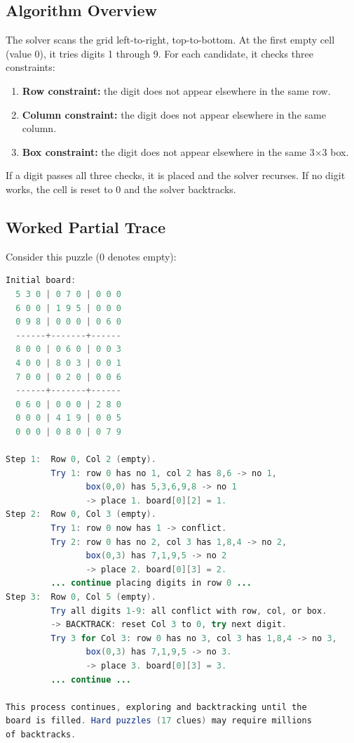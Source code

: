 \subsection{Algorithm Overview}

The solver scans the grid left-to-right, top-to-bottom. At the first empty cell (value 0), it tries digits 1 through 9. For each candidate, it checks three constraints:

\begin{enumerate}
\item \textbf{Row constraint:} the digit does not appear elsewhere in the same row.
\item \textbf{Column constraint:} the digit does not appear elsewhere in the same column.
\item \textbf{Box constraint:} the digit does not appear elsewhere in the same 3$\times $3 box.
\end{enumerate}

If a digit passes all three checks, it is placed and the solver recurses. If no digit works, the cell is reset to 0 and the solver backtracks.

\subsection{Worked Partial Trace}

Consider this puzzle (0 denotes empty):

\begin{lstlisting}[language=Java]
Initial board:
  5 3 0 | 0 7 0 | 0 0 0
  6 0 0 | 1 9 5 | 0 0 0
  0 9 8 | 0 0 0 | 0 6 0
  ------+-------+------
  8 0 0 | 0 6 0 | 0 0 3
  4 0 0 | 8 0 3 | 0 0 1
  7 0 0 | 0 2 0 | 0 0 6
  ------+-------+------
  0 6 0 | 0 0 0 | 2 8 0
  0 0 0 | 4 1 9 | 0 0 5
  0 0 0 | 0 8 0 | 0 7 9

Step 1:  Row 0, Col 2 (empty).
         Try 1: row 0 has no 1, col 2 has 8,6 -> no 1,
                box(0,0) has 5,3,6,9,8 -> no 1
                -> place 1. board[0][2] = 1.
Step 2:  Row 0, Col 3 (empty).
         Try 1: row 0 now has 1 -> conflict.
         Try 2: row 0 has no 2, col 3 has 1,8,4 -> no 2,
                box(0,3) has 7,1,9,5 -> no 2
                -> place 2. board[0][3] = 2.
         ... continue placing digits in row 0 ...
Step 3:  Row 0, Col 5 (empty).
         Try all digits 1-9: all conflict with row, col, or box.
         -> BACKTRACK: reset Col 3 to 0, try next digit.
         Try 3 for Col 3: row 0 has no 3, col 3 has 1,8,4 -> no 3,
                box(0,3) has 7,1,9,5 -> no 3.
                -> place 3. board[0][3] = 3.
         ... continue ...
         
This process continues, exploring and backtracking until the
board is filled. Hard puzzles (17 clues) may require millions
of backtracks.
\end{lstlisting}

